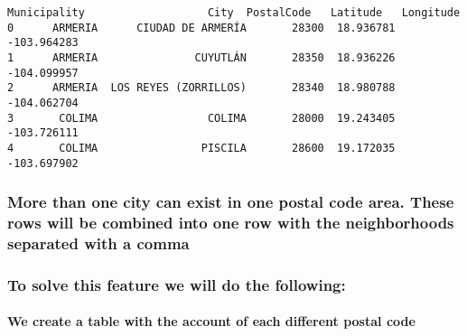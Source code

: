 \documentclass[11pt]{article}
\makeatletter
\newcommand{\boxspacing}{\kern\kvtcb@left@rule\kern\kvtcb@boxsep}
\newcommand{\prompt}[4]{
        \ttfamily\llap{{\color{#2}[#3]:\hspace{3pt}#4}}\vspace{-\baselineskip}
    }
\makeatother
\begin{document}
            \begin{tcolorbox}[breakable, size=fbox, boxrule=.5pt, pad at break*=1mm, opacityfill=0]
\prompt{Out}{outcolor}{12}{\boxspacing}
\begin{Verbatim}[commandchars=\\\{\}]
  Municipality                   City  PostalCode   Latitude   Longitude
0      ARMERIA      CIUDAD DE ARMERÍA       28300  18.936781 -103.964283
1      ARMERIA               CUYUTLÁN       28350  18.936226 -104.099957
2      ARMERIA  LOS REYES (ZORRILLOS)       28340  18.980788 -104.062704
3       COLIMA                 COLIMA       28000  19.243405 -103.726111
4       COLIMA                PISCILA       28600  19.172035 -103.697902
\end{Verbatim}
\end{tcolorbox}
        
    \hypertarget{more-than-one-city-can-exist-in-one-postal-code-area.-these-rows-will-be-combined-into-one-row-with-the-neighborhoods-separated-with-a-comma}{%
\subsubsection{More than one city can exist in one postal code area.
These rows will be combined into one row with the neighborhoods
separated with a
comma}\label{more-than-one-city-can-exist-in-one-postal-code-area.-these-rows-will-be-combined-into-one-row-with-the-neighborhoods-separated-with-a-comma}}

\hypertarget{to-solve-this-feature-we-will-do-the-following}{%
\subsubsection{To solve this feature we will do the
following:}\label{to-solve-this-feature-we-will-do-the-following}}

\hypertarget{we-create-a-table-with-the-account-of-each-different-postal-code}{%
\paragraph{We create a table with the account of each different postal
code}\label{we-create-a-table-with-the-account-of-each-different-postal-code}}
\end{document}
